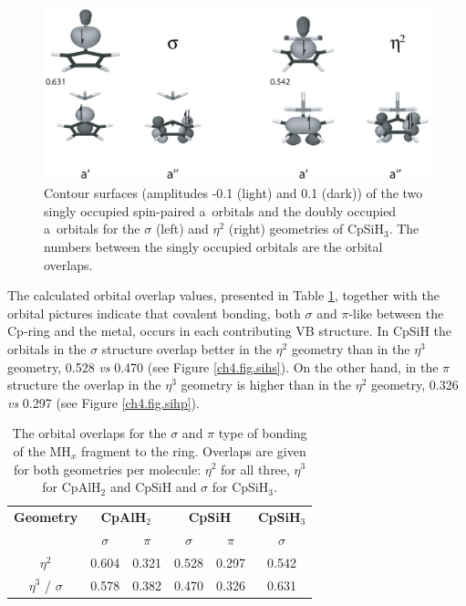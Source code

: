 \begin{figure} [htbp]
\begin{center}
\includegraphics[scale=0.67]{cyclopentadienyl/figures/sih3_sigma.eps}
\end{center}
\caption{Contour surfaces (amplitudes -0.1 (light) and 0.1 (dark)) of the two singly occupied spin-paired a\textquotesingle\ orbitals and the doubly occupied a\textquotesingle\textquotesingle\ orbitals for the $\sigma$ (left) and $\eta^{2}$ (right) geometries of CpSiH$_3$. The numbers between the singly occupied orbitals are the orbital overlaps.}
\label{ch4.fig.sih3}
\end{figure}

The calculated orbital overlap values, presented in Table \ref{ch4.tab.overlaps}, together with the orbital pictures indicate that covalent bonding, both $\sigma$ and $\pi$-like between the Cp-ring and the metal, occurs in each contributing VB structure. In CpSiH the orbitals in the $\sigma$ structure overlap better in the $\eta^2$ geometry than in the $\eta^3$ geometry, 0.528 \textit{vs} 0.470 (see Figure \ref{ch4.fig.sihs}). On the other hand, in the $\pi$ structure the overlap in the $\eta^{3}$ geometry is higher than in the $\eta^{2}$ geometry, 0.326 \textit{vs} 0.297 (see Figure \ref{ch4.fig.sihp}).
\begin{table}[hbtp]
\caption{The orbital overlaps for the $\sigma$ and $\pi$ type of bonding of the MH$_x$ fragment to the ring. Overlaps are given for both geometries per molecule: $\eta^2$ for all three, $\eta^3$ for CpAlH$_2$ and CpSiH and $\sigma$ for CpSiH$_3$.}
\center
\begin{tabular}{|c|cc|cc|c|}
\hline
\textbf{Geometry}&
\multicolumn{2}{c|}{\textbf{CpAlH$_2$}}&
\multicolumn{2}{c|}{\textbf{CpSiH}}&
\textbf{CpSiH$_3$}\\
&
$\sigma$&
$\pi$&
$\sigma$&
$\pi$&
$\sigma$\\
\hline
$\eta^{2}$& 0.604 & 0.321 & 0.528 & 0.297 & 0.542 \\
$\eta^{3}$ / $\sigma$ & 0.578 & 0.382 & 0.470 & 0.326 & 0.631 \\
\hline
\end{tabular}
\label{ch4.tab.overlaps}
\end{table}

